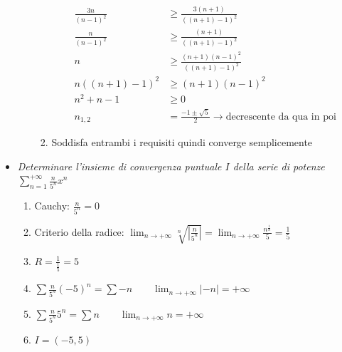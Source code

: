 \documentclass[10pt, a4paper]{article}
\begin{document}
\begin{itemize}
\begin{enumerate}
\begin{enumerate}
\begin{equation*}
                        \begin{split}
                            \frac{3n}{(n-1)^2} &\geq \frac{3(n+1)}{((n+1)-1)^2}\\
                            \frac{n}{(n-1)^2} &\geq \frac{(n+1)}{((n+1)-1)^2}\\
                            n &\geq \frac{(n+1)(n-1)^2}{((n+1)-1)^2}\\
                            n((n+1)-1)^2 &\geq (n+1)(n-1)^2\\
                            n^2+n-1&\geq 0\\
                            n_{1,2}&=\frac{-1\pm\sqrt{5}}{2}\rightarrow \text{decrescente da qua in poi}
                        \end{split}
                    \end{equation*}
                    \item Soddisfa entrambi i requisiti quindi converge semplicemente
                \end{enumerate}
            \end{enumerate}
            \item \textit{Determinare l'insieme di convergenza puntuale $I$ della serie di potenze}   $\displaystyle \sum_{n=1}^{+\infty}\frac{n}{5^n}x^n$ \begin{enumerate}
                \item Cauchy: $\displaystyle \frac{n}{5^n}=0$
                \item Criterio della radice: $\displaystyle \lim_{n\to +\infty}\sqrt[n]{\left|\frac{n}{5^n}\right|}=\lim_{n\to +\infty}\frac{n^\frac{1}{n}}{5}=\frac{1}{5}$
                \item $\displaystyle R=\frac{1}{\frac{1}{5}}=5$
                \item $\displaystyle\sum \frac{n}{5^n}(-5)^n=\sum -n \qquad \lim_{n\to +\infty}|-n|=+\infty$
                \item $\displaystyle\sum \frac{n}{5^n}5^n=\sum n \qquad \lim_{n\to +\infty}n=+\infty$
                \item $I=(-5,5)$
            \end{enumerate}
        \end{itemize}
\end{document}
